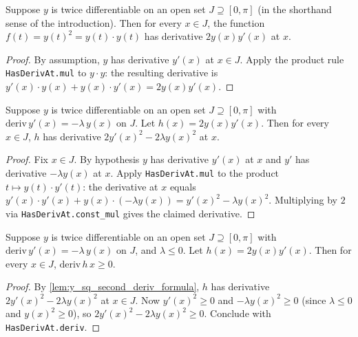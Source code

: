 \begin{lemma}
    \label{lem:y_sq_first_deriv}
    Suppose $y$ is twice differentiable on an open set $J \supseteq [0,\pi]$
    (in the shorthand sense of the introduction). Then for every $x \in J$, the
    function $f(t) = y(t)^2 = y(t) \cdot y(t)$ has derivative $2 y(x) y'(x)$
    at $x$.
\end{lemma}
\begin{proof}
    By assumption, $y$ has derivative $y'(x)$ at $x \in J$. Apply the product
    rule \texttt{HasDerivAt.mul} to $y \cdot y$: the resulting derivative is
    $y'(x) \cdot y(x) + y(x) \cdot y'(x) = 2 y(x) y'(x)$.
\end{proof}

\begin{lemma}
    \label{lem:y_sq_second_deriv_formula}
    \leanok
    Suppose $y$ is twice differentiable on an open set $J \supseteq [0,\pi]$
    with $\mathrm{deriv}\, y'(x) = -\lambda \, y(x)$ on $J$. Let
    $h(x) = 2 y(x) y'(x)$. Then for every $x \in J$, $h$ has derivative
    $2 y'(x)^2 - 2 \lambda y(x)^2$ at $x$.
\end{lemma}
\begin{proof}
    Fix $x \in J$. By hypothesis $y$ has derivative $y'(x)$ at $x$ and $y'$
    has derivative $-\lambda y(x)$ at $x$. Apply \texttt{HasDerivAt.mul} to the
    product $t \mapsto y(t) \cdot y'(t)$: the derivative at $x$ equals
    $y'(x) \cdot y'(x) + y(x) \cdot (-\lambda y(x)) = y'(x)^2 - \lambda y(x)^2$.
    Multiplying by $2$ via \texttt{HasDerivAt.const\_mul} gives the claimed
    derivative.
\end{proof}

\begin{lemma}
    \label{lem:y_sq_second_deriv_nonneg}
    \leanok
    Suppose $y$ is twice differentiable on an open set $J \supseteq [0,\pi]$
    with $\mathrm{deriv}\, y'(x) = -\lambda \, y(x)$ on $J$, and $\lambda \le 0$.
    Let $h(x) = 2 y(x) y'(x)$. Then for every $x \in J$,
    $\mathrm{deriv}\, h\, x \ge 0$.
\end{lemma}
\begin{proof}
    By \cref{lem:y_sq_second_deriv_formula}, $h$ has derivative
    $2 y'(x)^2 - 2 \lambda y(x)^2$ at $x \in J$. Now $y'(x)^2 \ge 0$ and
    $-\lambda y(x)^2 \ge 0$ (since $\lambda \le 0$ and $y(x)^2 \ge 0$), so
    $2 y'(x)^2 - 2 \lambda y(x)^2 \ge 0$. Conclude with \texttt{HasDerivAt.deriv}.
\end{proof}


